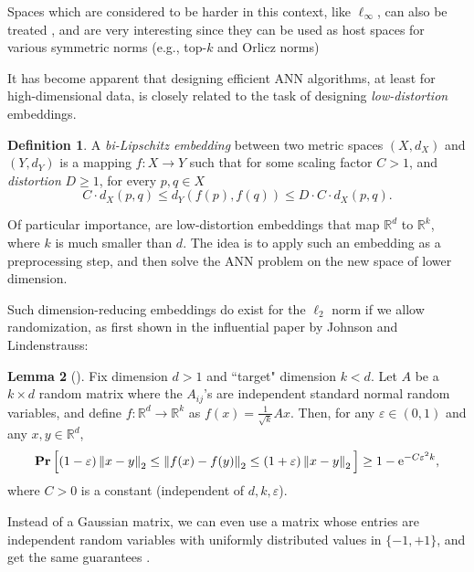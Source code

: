 \documentclass[10pt,a4paper,twoside]{book}
\newcommand{\rd}{\mathbb{R}^{d}}
\newcommand{\rk}{\mathbb{R}^{k}}
\newcommand{\ex}{{\rm e}}
\newcommand{\eps}{\varepsilon}
\newcommand{\norm}[1]{\left \rVert {#1} \right \rVert}
\DeclareMathOperator*{\prob}{\mathbf{Pr}}
\theoremstyle{definition}
\newtheorem{definition}{Definition}[chapter]
\newtheorem{lemma}[definition]{Lemma}
\theoremstyle{remark}
\begin{document}
Spaces which are considered to be harder in this context, like $\ell_{\infty}$, can also be treated \cite{Ind01, Chan17}, and are very interesting since they can be used as host spaces for various symmetric norms \cite{ANNRW17} (e.g., top-$k$ and Orlicz norms)

It has become apparent that designing efficient ANN algorithms, at least for high-dimensional data, is closely related to the task of designing \textit{low-distortion} embeddings.

\begin{definition} \label{bilips}
A \textit{bi-Lipschitz embedding} between two metric spaces $(X,d_X)$ and $(Y,d_{Y})$ is a mapping $f: X \rightarrow Y $ such that for some scaling factor $C>1$, and \textit{distortion} $D \geq 1$, for every $p, q \in X$ 
\begin{equation*}
    C \cdot d_X(p,q) \leq d_{Y}(f(p),f(q)) \leq D \cdot C \cdot d_X(p,q).
\end{equation*}
\end{definition}

Of particular importance, are low-distortion embeddings that map $\rd$ to $\mathbb{R}^k$, where $k$ is much smaller than $d$. The idea is to apply such an embedding as a preprocessing step, and then solve the ANN problem on the new space of lower dimension.

Such dimension-reducing embeddings do exist for the $\ell_2$ norm if we allow randomization, as first shown in the influential paper by Johnson and Lindenstrauss:

\begin{lemma}[\cite{JL84}] \label{lemma:jl}
Fix dimension $d>1$ and ``target" dimension $k<d$. Let $A$ be a $k {\times} d$ random matrix where the $A_{ij}$'s are independent standard normal random variables, and define $f: \rd \rightarrow \rk$ as $f(x) = \frac{1}{\sqrt{k}} A x$. Then, for any $\eps \in (0, 1)$ and any $x,y \in \rd$,
\begin{equation*}
    \prob \Big[ (1-\eps) \norm{x-y}_2 \leq \norm{f(x)-f(y)}_2 \leq (1+\eps) \norm{x-y}_2 \Big] \geq 1 - \ex^{-C \eps^2 k},
\end{equation*}
where $C>0$ is a constant (independent of $d,k, \eps$).
\end{lemma}

Instead of a Gaussian matrix, we can even use a matrix whose entries are independent random variables with uniformly distributed values in $\{-1,+1\}$, and get the same guarantees \cite{Ach03}.
\end{document}
